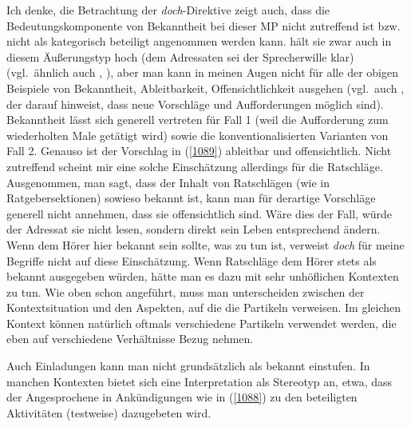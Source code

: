 Ich denke, die Betrachtung der \textit{doch}-Direktive zeigt auch, dass die Bedeutungs\-komponente von Bekanntheit bei dieser MP nicht zutreffend ist bzw. nicht als kategorisch beteiligt angenommen werden kann. \citet[118--119]{Thurmair1989} hält sie zwar auch in diesem Äußerungstyp hoch (dem Adressaten sei der Sprecherwille klar) (vgl.\ ähnlich auch \citealt[111]{Bublitz1978}, \citealt[168]{Karagjosova2004}), aber man kann in meinen Augen nicht für alle der obigen Beispiele von Bekanntheit, Ableitbarkeit, Offensichtlichkeit ausgehen (vgl.\ auch \citealt[401]{Ickler1994}, der darauf hinweist, dass neue Vorschläge und Aufforderungen möglich sind). Bekanntheit lässt sich generell vertreten für Fall 1 (weil die Aufforderung zum wiederholten Male getätigt wird) sowie die konventionalisierten Varianten von Fall 2. Genauso ist der Vorschlag in (\ref{1089}) ableitbar und offensichtlich. Nicht zutreffend scheint mir eine solche Einschätzung allerdings für die Ratschläge. Ausgenommen, man sagt, dass der Inhalt von Ratschlägen (wie in Ratgebersektionen) sowieso bekannt ist, kann man für derartige Vorschläge generell nicht annehmen, dass sie offensichtlich sind. Wäre dies der Fall, würde der Adressat sie nicht lesen, sondern direkt sein Leben entsprechend ändern. Wenn dem Hörer hier bekannt sein sollte, was zu tun ist, verweist \textit{doch} für meine Begriffe nicht auf diese Einschätzung. Wenn Ratschläge dem Hörer stets als bekannt ausgegeben würden, hätte man es dazu mit sehr unhöflichen Kontexten zu tun. Wie oben schon angeführt, muss man unterscheiden zwischen der Kontextsituation und den Aspekten, auf die die Partikeln verweisen. Im gleichen Kontext können natürlich oftmals verschiedene Partikeln verwendet werden, die eben auf verschiedene Verhältnisse Bezug nehmen.

Auch Einladungen kann man nicht grundsätzlich als bekannt einstufen. In manchen Kontexten bietet sich eine Interpretation als Stereotyp an, etwa, dass der Angesprochene in Ankündigungen wie in (\ref{1088}) zu den beteiligten Aktivitäten (testweise) dazugebeten wird. 
 
